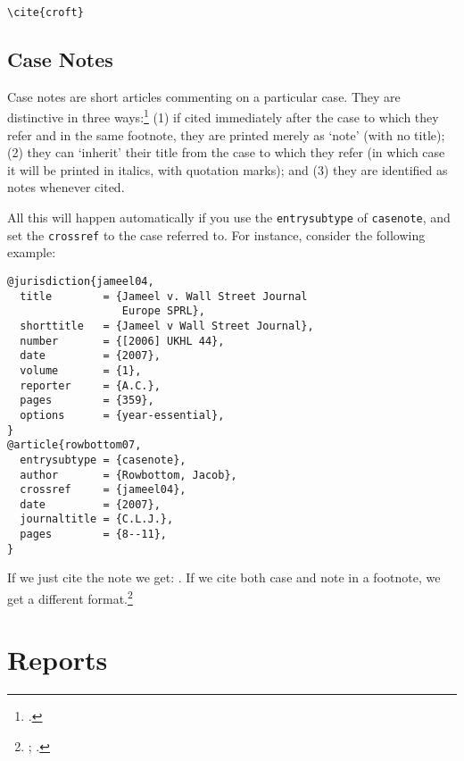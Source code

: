 \documentclass[a5paper,fontsize=9pt,DIV=1]{scrartcl}
\newcounter{egcounter}\setcounter{egcounter}{0}
\newenvironment{bibexample}[1][]{%
  \medskip\par\small\noindent\ignorespaces
  \marginpar{[\refstepcounter{egcounter}\arabic{egcounter}]\label{#1}}
  \begin{minipage}[t]{0.95\linewidth}}
 {\end{minipage}\par\medskip}
\newcommand{\egcite}[1]{\texttt{\textbackslash cite#1}}
\begin{document}
\begin{description}
\item[\egcite{\{croft\}}] \cite{croft}
\end{description}

\subsection{Case Notes\label{casenotes}}

Case notes are short articles commenting on a particular case. They
are distinctive in three ways:\footcite[37]{oscola} (1) if cited immediately after the case
to which they refer and in the same footnote, they are printed merely
as `note' (with no title); (2) they can `inherit' their title from the
case to which they refer (in which case it will be printed in italics, with quotation marks); and (3) they are identified as notes
whenever cited.

All this will happen automatically if you use the \texttt{entrysubtype} of \texttt{casenote}, and set the \texttt{crossref} to the case referred to.
For instance, consider the following example:

\begin{bibexample}[jameel04]
\begin{verbatim}
@jurisdiction{jameel04,
  title        = {Jameel v. Wall Street Journal
                  Europe SPRL},
  shorttitle   = {Jameel v Wall Street Journal},
  number       = {[2006] UKHL 44},
  date         = {2007},
  volume       = {1},
  reporter     = {A.C.},
  pages        = {359},
  options      = {year-essential},
}
@article{rowbottom07,
  entrysubtype = {casenote},
  author       = {Rowbottom, Jacob},
  crossref     = {jameel04},
  date         = {2007},
  journaltitle = {C.L.J.},
  pages        = {8--11},
}
\end{verbatim}
\end{bibexample}

If we just cite the note we get: \cite{rowbottom07}. If we cite both
case and note in a footnote, we get a different
format.\footnote{\cite{jameel04}; \cite[see][]{rowbottom07}.}

\section{Reports}
\end{document}
